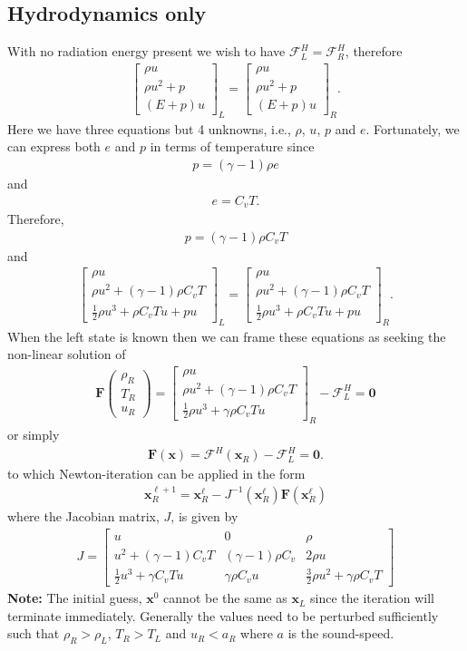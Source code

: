 \documentclass[10pt,letterpaper,notitlepage]{article}
\numberwithin{equation}{section}
\newcommand{\HydroF}{\mathcal{F}^H}
\newcommand{\half}{\frac{1}{2}}
\newcommand{\beq}{\begin{equation*} \begin{aligned}}
\newcommand{\eeq}{\end{aligned}\end{equation*}}
\newcommand{\beqn}{\begin{equation}\begin{aligned}}
\newcommand{\eeqn}{\end{aligned}\end{equation}}
\begin{document}
\begin{appendices}
\subsection{Hydrodynamics only}
With no radiation energy present we wish to have $\HydroF_L = \HydroF_R$, therefore
\beqn 
\begin{bmatrix}
	\rho u \\
	\rho u^2 + p \\
	(E+p)u
\end{bmatrix}_L
=
\begin{bmatrix}
	\rho u \\
	\rho u^2 + p \\
	(E+p)u
\end{bmatrix}_R.
\eeqn 
Here we have three equations but 4 unknowns, i.e., $\rho$, $u$, $p$ and $e$. Fortunately, we can express both $e$ and $p$ in terms of temperature since
\beq 
p = (\gamma-1)\rho e
\eeq 
and
\beq 
e = C_v T.
\eeq
Therefore, 
\beq 
p = (\gamma-1)\rho C_v T
\eeq 
and
\beqn 
\begin{bmatrix}
	\rho u \\
	\rho u^2 + (\gamma-1)\rho C_v T \\
	\half \rho u^3 + \rho C_v T u + pu
\end{bmatrix}_L
=
\begin{bmatrix}
	\rho u \\
	\rho u^2 + (\gamma-1)\rho C_v T \\
	\half \rho u^3 + \rho C_v T u + pu
\end{bmatrix}_R.
\eeqn 
When the left state is known then we can frame these equations as seeking the non-linear solution of
\beqn 
\mathbf{F}
\begin{pmatrix}
	\rho_R \\ T_R \\ u_R
\end{pmatrix}
= 
\begin{bmatrix}
	\rho u \\
	\rho u^2 + (\gamma-1)\rho C_v T \\
	\half \rho u^3 + \gamma \rho C_v T u
\end{bmatrix}_R
- 
\HydroF_L = \mathbf{0}
\eeqn 
or simply
\beqn 
\mathbf{F}(\mathbf{x}) = \HydroF(\mathbf{x}_R) - \HydroF_L = \mathbf{0}.
\eeqn 
to which Newton-iteration can be applied in the form
\beq
\mathbf{x}_R^{\ell+1} = \mathbf{x}_R^\ell - J^{-1}(\mathbf{x}_R^\ell) \mathbf{F}(\mathbf{x}_R^\ell)
\eeq 
where the Jacobian matrix, $J$, is given by
\beqn 
J = 
\begin{bmatrix}
	u & 0 & \rho \\
	u^2 + (\gamma-1)C_v T & (\gamma-1)\rho C_v & 2\rho u \\
	\half u^3 + \gamma C_v T u  & \gamma \rho C_v u & \frac{3}{2}\rho u^2 + \gamma \rho C_v T 
\end{bmatrix}
\eeqn 
\newline 
\newline
\textbf{Note:} The initial guess, $\mathbf{x}^0$ cannot be the same as $\mathbf{x}_L$ since the iteration will terminate immediately. Generally the values need to be perturbed sufficiently such that $\rho_R > \rho_L$, $T_R > T_L$ and $u_R < a_R$ where $a$ is the sound-speed.


\end{appendices}
\end{document}
